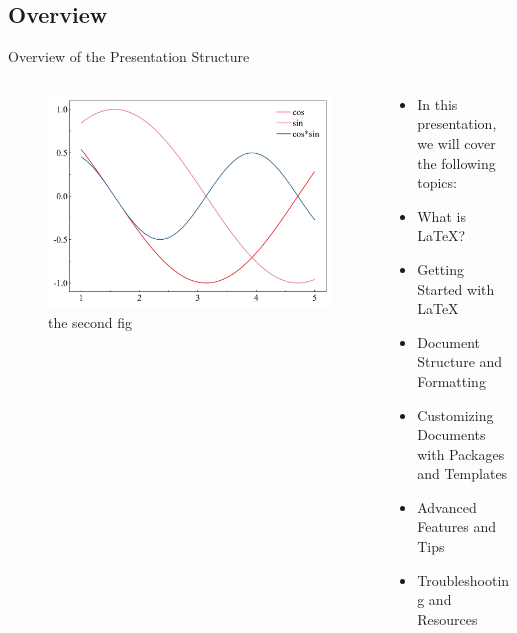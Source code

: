\documentclass{SUSTechBeamer}
\begin{document}
\subsection{Overview}
\begin{frame}{Overview of the Presentation Structure}\
    \begin{columns}
        \begin{column}{0.4\textwidth}
            \begin{figure}[h]
                \centering
                \includegraphics[width=\linewidth]{demo_fig/pngfig.png}
                \caption{the second fig}
                \label{fig:fig2}
            \end{figure}
        \end{column}
        \begin{column}{0.6\textwidth}
        \begin{itemize}
            \item In this presentation, we will cover the following topics:
            \item What is \LaTeX?
            \item Getting Started with \LaTeX
            \item Document Structure and Formatting
            \item Customizing Documents with Packages and Templates
            \item Advanced Features and Tips
            \item Troubleshooting and Resources
        \end{itemize}
    \end{column}
\end{columns}
\end{frame}
\end{document}
